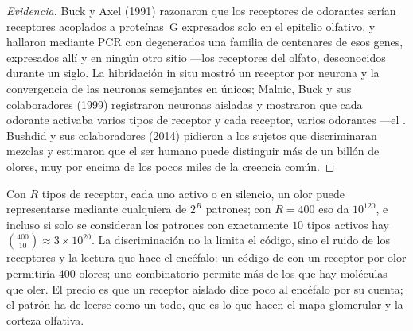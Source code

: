 \begin{proof}[Evidencia]
Buck y Axel (1991) razonaron que los receptores de odorantes serían
receptores acoplados a proteínas~G expresados solo en el epitelio
olfativo, y hallaron mediante PCR con  degenerados una familia
de centenares de esos genes, expresados allí y en ningún otro sitio
---los receptores del olfato, desconocidos durante un siglo. La
hibridación in situ mostró un receptor por neurona y la convergencia de
las neuronas semejantes en  únicos; Malnic, Buck y sus
colaboradores (1999) registraron neuronas aisladas y mostraron que cada
odorante activaba varios tipos de receptor y cada receptor, varios
odorantes ---el . Bushdid y sus colaboradores (2014)
pidieron a los sujetos que discriminaran mezclas y estimaron que el ser
humano puede distinguir más de un billón de olores, muy por encima de
los pocos miles de la creencia común.
\end{proof}

\begin{proposition}\label{prop:b3:sensory-systems:combinatorial}
Con $R$ tipos de receptor, cada uno activo o en silencio, un olor puede
representarse mediante cualquiera de $2^{R}$ patrones; con $R = 400$
eso da $10^{120}$, e incluso si solo se consideran los patrones con
exactamente $10$ tipos activos hay
$\binom{400}{10} \approx 3\times 10^{20}$. La discriminación no la
limita el código, sino el ruido de los receptores y la lectura que hace
el encéfalo: un código de  con un receptor por olor
permitiría $400$ olores; uno combinatorio permite más de los que hay
moléculas que oler. El precio es que un receptor aislado dice poco al
encéfalo por su cuenta; el patrón ha de leerse como un todo, que es lo
que hacen el mapa glomerular y la corteza olfativa.
\end{proposition}

